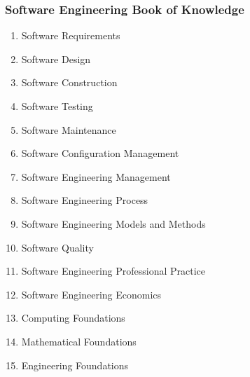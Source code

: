 \documentclass{../../slides-style}
\begin{document}
    \begin{frame}
        \frametitle{Software Engineering Book of Knowledge}
        \begin{footnotesize}
            \begin{enumerate}
                \item Software Requirements
                \item Software Design
                \item Software Construction
                \item Software Testing
                \item Software Maintenance
                \item Software Configuration Management
                \item Software Engineering Management
                \item Software Engineering Process
                \item Software Engineering Models and Methods
                \item Software Quality
                \item Software Engineering Professional Practice
                \item Software Engineering Economics
                \item Computing Foundations
                \item Mathematical Foundations
                \item Engineering Foundations
            \end{enumerate}
        \end{footnotesize}
    \end{frame}
\end{document}
